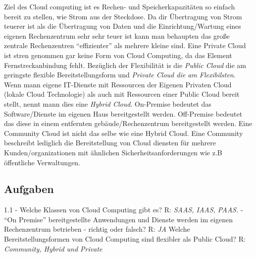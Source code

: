 \documentclass[a4paper,10pt]{article}
\begin{document}
Ziel des Cloud computing ist es Rechen- und Speicherkapazitäten so einfach bereit zu stellen, wie Strom aus der Steckdose.
\vspace{3mm}
Da dir Übertragung von Strom teuerer ist als die Übertragung von Daten und die Einrichtung/Wartung eines eigenen Rechenzentrum sehr sehr teuer ist kann man behaupten das große zentrale Rechenzentren ``effizienter'' als mehrere kleine sind.
\vspace{3mm}
Eine Private Cloud ist stren genommen gar keine Form von Cloud Computing, da das Element Fernstreckanbindung fehlt.
Bezüglich der Flexibilität is die \textit{Public Cloud} die am geringste flexible Bereitstellungsform und \textit{Private Cloud die am Flexibilsten}.
\vspace{3mm}
Wenn mann eigene IT-Dienste mit Ressourcen der Eigenen Privaten Cloud (lokale Cloud Technologie) als auch mit Ressourcen einer Public Cloud bereit stellt, nennt mann dies eine \textit{Hybrid Cloud}. On-Premise bedeutet das Software/Dienste im eigenen Haus bereitgestellt werden. Off-Premise bedeutet das diese in einem entfernten gebäude/Rechenzentrum bereitgestellt werden. \vspace{3mm}
Eine Community Cloud ist nicht das selbe wie eine Hybrid Cloud. Eine Community beschreibt lediglich die Bereitstellung von Cloud diensten für mehrere Kunden/organizationen mit ähnlichen Sicherheitsanforderungen wie z.B öffentliche Verwaltungen.

\subsection{Aufgaben}
1.1 - Welche Klassen von Cloud Computing gibt es? \newline
R: \textit{SAAS, IAAS, PAAS.}  - ``On Premise'' bereitgestellte Anwendungen und Dienste werden im eigenen Rechenzentrum betrieben - richtig oder falsch? \newline
R: \textit{JA} \break
Welche Bereitstellungsformen von Cloud Computing sind flexibler als Public Cloud? \break
R: \textit{Community, Hybrid und Private}
\end{document}
